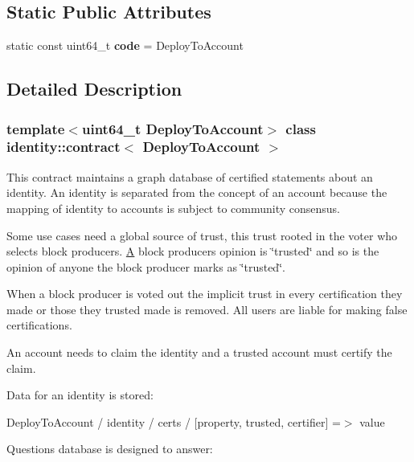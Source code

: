 \subsection*{Static Public Attributes}
\begin{DoxyCompactItemize}
\item 
\mbox{\label{classidentity_1_1contract_a522a5c66b6239b2d266d109f1d0bf038}} 
static const uint64\+\_\+t {\bfseries code} = Deploy\+To\+Account
\end{DoxyCompactItemize}


\subsection{Detailed Description}
\subsubsection*{template$<$uint64\+\_\+t Deploy\+To\+Account$>$\newline
class identity\+::contract$<$ Deploy\+To\+Account $>$}

This contract maintains a graph database of certified statements about an identity. An identity is separated from the concept of an account because the mapping of identity to accounts is subject to community consensus.

Some use cases need a global source of trust, this trust rooted in the voter who selects block producers. \mbox{\hyperlink{struct_a}{A}} block producer\textquotesingle{}s opinion is \char`\"{}trusted\char`\"{} and so is the opinion of anyone the block producer marks as \char`\"{}trusted\char`\"{}.

When a block producer is voted out the implicit trust in every certification they made or those they trusted made is removed. All users are liable for making false certifications.

An account needs to claim the identity and a trusted account must certify the claim.

Data for an identity is stored\+:

Deploy\+To\+Account / identity / certs / \mbox{[}property, trusted, certifier\mbox{]} =$>$ value

Questions database is designed to answer\+:


